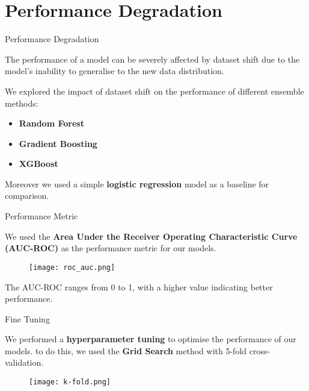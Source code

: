 \section{Performance Degradation} \label{sec:performance-degradation}

\begin{frame}{Performance Degradation}
    
    The performance of a model can be severely affected by dataset shift due to the model's inability to generalise to the new data distribution.
    
    We explored the impact of dataset shift on the performance of different ensemble methods:
    
    \begin{itemize}
        \item \textbf{Random Forest}
        \item \textbf{Gradient Boosting}
        \item \textbf{XGBoost}
    \end{itemize}

    Moreover we used a simple \textbf{logistic regression} model as a baseline for comparison.

\end{frame}

\begin{frame}{Performance Metric}
    
    We used the \textbf{Area Under the Receiver Operating Characteristic Curve (AUC-ROC)} as the performance metric for our models.

    \begin{figure}
        \centering
        \vfill
        \texttt{[image: roc\_auc.png]}
    \end{figure}

    The AUC-ROC ranges from 0 to 1, with a higher value indicating better performance.

\end{frame}

\begin{frame}{Fine Tuning}
    
    We performed a \textbf{hyperparameter tuning} to optimise the performance of our models. to do this, we used the \textbf{Grid Search} method with 5-fold cross-validation.

    \begin{figure}
        \centering
        \vfill
        \texttt{[image: k-fold.png]}
    \end{figure}

\end{frame}

